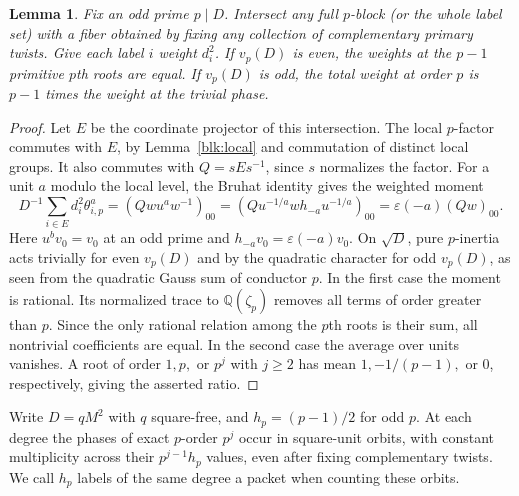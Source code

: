 \documentclass[11pt]{amsart}
\numberwithin{equation}{section}
\newtheorem{lemma}[theorem]{Lemma}
\begin{document}
\begin{lemma}\label{blk:moments}
Fix an odd prime $p\mid D$. Intersect any full $p$-block (or the whole label set) with a fiber obtained by fixing any collection of complementary primary twists. Give each label $i$ weight $d_i^2$. If $v_p(D)$ is even, the weights at the $p-1$ primitive $p$th roots are equal. If $v_p(D)$ is odd, the total weight at order $p$ is $p-1$ times the weight at the trivial phase.
\end{lemma}
\begin{proof}
Let $E$ be the coordinate projector of this intersection. The local $p$-factor commutes with $E$, by Lemma~\ref{blk:local} and commutation of distinct local groups. It also commutes with $Q=sEs^{-1}$, since $s$ normalizes the factor. For a unit $a$ modulo the local level, the Bruhat identity gives the weighted moment
\[
 D^{-1}\sum_{i\in E}d_i^2\theta_{i,p}^a
 =(Qwu^aw^{-1})_{00}
 =(Qu^{-1/a}wh_{-a}u^{-1/a})_{00}
 =\varepsilon(-a)(Qw)_{00}.
\]
Here $u^b v_0=v_0$ at an odd prime and $h_{-a}v_0=\varepsilon(-a)v_0$. On $\sqrt D$, pure $p$-inertia acts trivially for even $v_p(D)$ and by the quadratic character for odd $v_p(D)$, as seen from the quadratic Gauss sum of conductor $p$. In the first case the moment is rational. Its normalized trace to $\mathbb Q(\zeta_p)$ removes all terms of order greater than $p$. Since the only rational relation among the $p$th roots is their sum, all nontrivial coefficients are equal. In the second case the average over units vanishes. A root of order $1,p,$ or $p^j$ with $j\ge2$ has mean $1,-1/(p-1),$ or $0$, respectively, giving the asserted ratio.
\end{proof}

Write $D=qM^2$ with $q$ square-free, and $h_p=(p-1)/2$ for odd $p$. At each degree the phases of exact $p$-order $p^j$ occur in square-unit orbits, with constant multiplicity across their $p^{j-1}h_p$ values, even after fixing complementary twists. We call $h_p$ labels of the same degree a packet when counting these orbits.
\end{document}

